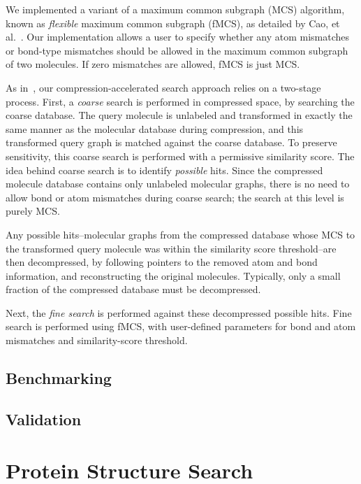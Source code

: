 \documentclass{amsbook}
\theoremstyle{definition}
\theoremstyle{remark}
\numberwithin{equation}{section}
\begin{document}
We implemented a variant of a maximum common subgraph (MCS) algorithm, known as \emph{flexible} maximum
common subgraph (fMCS), as detailed by Cao, et al.~\cite{cao}.
Our implementation allows a user to specify whether any atom mismatches or bond-type mismatches should be 
allowed in the maximum common subgraph of two molecules.
If zero mismatches are allowed, fMCS is just MCS.

As in~\cite{loh2012compressive}, our compression-accelerated search approach relies on a two-stage process.
First, a \emph{coarse} search is performed in compressed space, by searching the coarse database.
The query molecule is unlabeled and transformed in exactly the same manner as the molecular database
during compression, and this transformed query graph is matched against the coarse database.
To preserve sensitivity, this coarse search is performed with a permissive similarity score.
The idea behind coarse search is to identify \emph{possible} hits.
Since the compressed molecule database contains only unlabeled molecular graphs, there is no need to
allow bond or atom mismatches during coarse search; the search at this level is purely MCS.

Any possible hits--molecular graphs from the compressed database whose MCS to the transformed
query molecule was within the similarity score threshold--are then decompressed, by following
pointers to the removed atom and bond information, and reconstructing the original molecules.
Typically, only a small fraction of the compressed database must be decompressed.

Next, the \emph{fine search} is performed against these decompressed possible hits.
Fine search is performed using fMCS, with user-defined parameters for bond and atom mismatches and
similarity-score threshold.

\subsection*{Benchmarking}

\subsection*{Validation}

\section*{Protein Structure Search}
\end{document}
